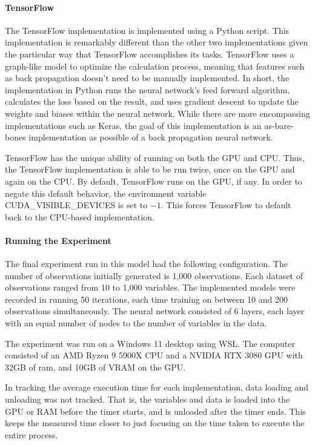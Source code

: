 \documentclass[12pt]{article}
\begin{document}
\paragraph{TensorFlow}

The TensorFlow \cite{lib_tensorflow} implementation is implemented using a Python \cite{lang_python} script.
This implementation is remarkably different than the other two implementations given the particular way that TensorFlow accomplishes its tasks.
TensorFlow uses a graph-like model to optimize the calculation process, meaning that features such as back propagation doesn't need to be manually implemented.
In short, the implementation in Python runs the neural network's feed forward algorithm, calculates the loss based on the result, and uses gradient descent to update the weights and biases within the neural network.
While there are more encompassing implementations such as Keras, the goal of this implementation is an as-bare-bones implementation as possible of a back propagation neural network.

TensorFlow has the unique ability of running on both the GPU and CPU.
Thus, the TensorFlow implementation is able to be run twice, once on the GPU and again on the CPU.
By default, TensorFlow runs on the GPU, if any.
In order to negate this default behavior, the environment variable CUDA\_VISIBLE\_DEVICES is set to $-1$.
This forces TensorFlow to default back to the CPU-based implementation.

\paragraph{Running the Experiment}

The final experiment run in this model had the following configuration.
The number of observations initially generated is 1,000 observations.
Each dataset of observations ranged from 10 to 1,000 variables.
The implemented models were recorded in running 50 iterations, each time training on between 10 and 200 observations simultaneously.
The neural network consisted of 6 layers, each layer with an equal number of nodes to the number of variables in the data.

The experiment was run on a Windows 11 desktop using WSL.
The computer consisted of an AMD Ryzen 9 5900X CPU and a NVIDIA RTX 3080 GPU with 32GB of ram, and 10GB of VRAM on the GPU.

In tracking the average execution time for each implementation, data loading and unloading was not tracked.
That is, the variables and data is loaded into the GPU or RAM before the timer starts, and is unloaded after the timer ends.
This keeps the measured time closer to just focusing on the time taken to execute the entire process.
\end{document}
